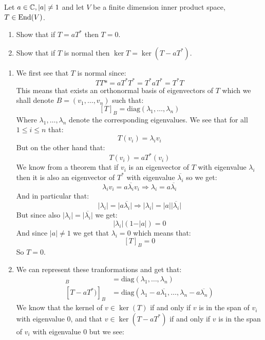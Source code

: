 \documentclass[11pt, a4paper]{article}
\begin{document}
\begin{exercise}
  Let $a \in \mathbb{C}, |a| \neq 1$ and let $V$ be a finite dimension inner product
  space, $T \in \operatorname{End}(V)$.
  \begin{enumerate}
    \item[(1)] Show that if $T = a T^{*}$ then $T = 0$.
    \item[(2)] Show that if $T$ is normal then $\ker T = \ker(T - aT^{*})$.
  \end{enumerate}
\end{exercise}
\begin{solution} \phantom{}
\begin{enumerate}
  \item[(1)]
  We first see that $T$ is normal since:
  \[
    TT* = aT^*T^* = T^*aT^* = T^*T
  \]
  This means that exists an orthonormal basis of eigenvectors of $T$ which
  we shall denote $B=(v_1,\dots,v_n)$ such that:
  \[
    [T]_B = \text{diag}(\lambda_1,\dots,\lambda_n)
  \]
  Where $\lambda_1,\dots,\lambda_n$ denote the corresponding eigenvalues.
  We see that for all $1\le i \le n$ that:
  \[
    T(v_i) = \lambda_i v_i
  \]
  But on the other hand that:
  \[
    T(v_i) = aT^*(v_i)
  \]
  We know from a theorem that if $v_i$ is an eigenvector of $T$ with 
  eigenvalue $\lambda_i$ then it is also an eigenvector of $T^*$ with
  eigenvalue $\overline{\lambda_i}$ so we get:
  \[
    \lambda_i v_i = a \overline{\lambda_i} v_i \Rightarrow
    \lambda_i = a \overline{\lambda_i}
  \]
  And in particular that:
  \[
    \vert \lambda_i \vert = \vert a \overline{\lambda_i} \vert \Rightarrow
    \vert \lambda_i \vert = \vert a \vert \vert \overline{\lambda_i} \vert
  \]
  But since also $\vert \lambda_i \vert = \vert \overline{\lambda_i} \vert$
  we get:
  \[
    \vert \lambda_i \vert (1-\vert a \vert) = 0
  \]
  And since $\vert a \vert \neq 1$ we get that $\lambda_i = 0$ which means
  that:
  \[
    [T]_B = 0
  \]
  So $T = 0$.
  \item[(2)]
  We can represent these tranformations and get that:
  \begin{align*}
    [T]_B &= \text{diag}(\lambda_1,\dots,\lambda_n) \\
    [T - aT^{*})]_B &= \text{diag}(\lambda_1 - a \overline{\lambda_1},\dots,
    \lambda_n - a \overline{\lambda_n})
  \end{align*}
  We know that the kernel of $v\in \ker(T)$ if and only if $v$ is in the span
  of $v_i$ with eigenvalue $0$, and that $v\in \ker(T - aT^{*})$ if and only
  if $v$ is in the span of $v_i$ with eigenvalue $0$ but we see:

\end{enumerate}
\end{solution}
\end{document}
